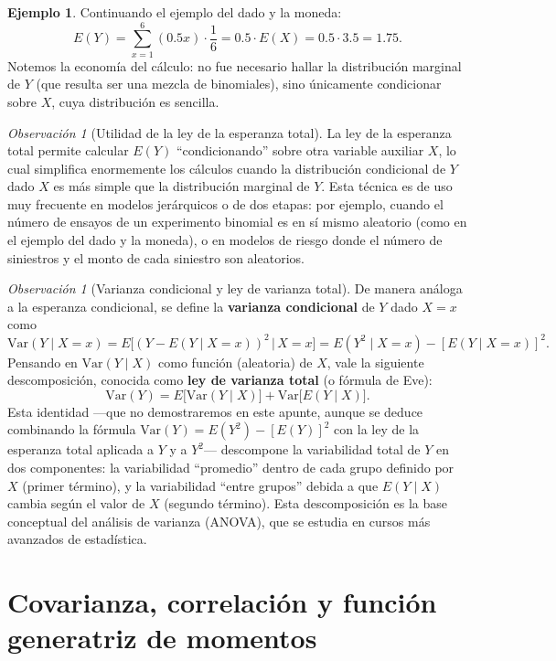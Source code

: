 \documentclass[11pt,a4paper]{article}
\theoremstyle{plain}
\theoremstyle{definition}
\newtheorem{ejemplo}[teorema]{Ejemplo}
\theoremstyle{remark}
\newtheorem{observacion}[teorema]{Observación}
\begin{document}
\begin{ejemplo}
Continuando el ejemplo del dado y la moneda:
\[
E(Y) = \sum_{x=1}^{6} (0.5x)\cdot\frac16 = 0.5\cdot E(X) = 0.5\cdot 3.5 = 1.75.
\]
Notemos la economía del cálculo: no fue necesario hallar la distribución marginal de $Y$ (que resulta ser una mezcla de binomiales), sino únicamente condicionar sobre $X$, cuya distribución es sencilla.
\end{ejemplo}

\begin{observacion}[Utilidad de la ley de la esperanza total]
La ley de la esperanza total permite calcular $E(Y)$ ``condicionando'' sobre otra variable auxiliar $X$, lo cual simplifica enormemente los cálculos cuando la distribución condicional de $Y$ dado $X$ es más simple que la distribución marginal de $Y$. Esta técnica es de uso muy frecuente en modelos jerárquicos o de dos etapas: por ejemplo, cuando el número de ensayos de un experimento binomial es en sí mismo aleatorio (como en el ejemplo del dado y la moneda), o en modelos de riesgo donde el número de siniestros y el monto de cada siniestro son aleatorios.
\end{observacion}

\begin{observacion}[Varianza condicional y ley de varianza total]
De manera análoga a la esperanza condicional, se define la \textbf{varianza condicional} de $Y$ dado $X=x$ como
\[
\text{Var}(Y\mid X=x) = E\big[(Y-E(Y\mid X=x))^2 \,\big|\, X=x\big] = E(Y^2\mid X=x) - [E(Y\mid X=x)]^2.
\]
Pensando en $\text{Var}(Y\mid X)$ como función (aleatoria) de $X$, vale la siguiente descomposición, conocida como \textbf{ley de varianza total} (o fórmula de Eve):
\[
\text{Var}(Y) = E\big[\text{Var}(Y\mid X)\big] + \text{Var}\big[E(Y\mid X)\big].
\]
Esta identidad —que no demostraremos en este apunte, aunque se deduce combinando la fórmula $\text{Var}(Y)=E(Y^2)-[E(Y)]^2$ con la ley de la esperanza total aplicada a $Y$ y a $Y^2$— descompone la variabilidad total de $Y$ en dos componentes: la variabilidad ``promedio'' dentro de cada grupo definido por $X$ (primer término), y la variabilidad ``entre grupos'' debida a que $E(Y\mid X)$ cambia según el valor de $X$ (segundo término). Esta descomposición es la base conceptual del análisis de varianza (ANOVA), que se estudia en cursos más avanzados de estadística.
\end{observacion}

\newpage
\section{Covarianza, correlación y función generatriz de momentos}
\label{sec:covarianza}
\label{sec:fgm}
\end{document}
